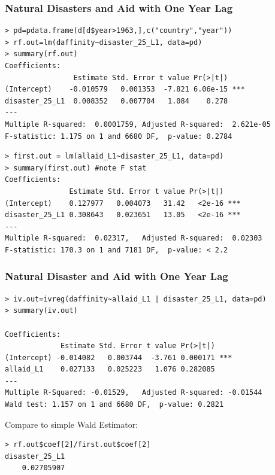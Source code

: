 \documentclass[xcolor=dvipsnames]{beamer}
\begin{document}
\begin{frame}[fragile]
\frametitle{Natural Disasters and Aid with One Year Lag}
\scriptsize
\begin{verbatim}
> pd=pdata.frame(d[d$year>1963,],c("country","year"))
> rf.out=lm(daffinity~disaster_25_L1, data=pd)
> summary(rf.out)
Coefficients:
                Estimate Std. Error t value Pr(>|t|)    
(Intercept)    -0.010579   0.001353  -7.821 6.06e-15 ***
disaster_25_L1  0.008352   0.007704   1.084    0.278    
---
Multiple R-squared:  0.0001759,	Adjusted R-squared:  2.621e-05 
F-statistic: 1.175 on 1 and 6680 DF,  p-value: 0.2784
\end{verbatim}
\begin{verbatim}
> first.out = lm(allaid_L1~disaster_25_L1, data=pd)
> summary(first.out) #note F stat
Coefficients:
               Estimate Std. Error t value Pr(>|t|)    
(Intercept)    0.127977   0.004073   31.42   <2e-16 ***
disaster_25_L1 0.308643   0.023651   13.05   <2e-16 ***
---
Multiple R-squared:  0.02317,	Adjusted R-squared:  0.02303 
F-statistic: 170.3 on 1 and 7181 DF,  p-value: < 2.2
\end{verbatim}
\end{frame}

\begin{frame}[fragile]
\frametitle{Natural Disaster and Aid with One Year Lag}
\scriptsize
\begin{verbatim}
> iv.out=ivreg(daffinity~allaid_L1 | disaster_25_L1, data=pd)
> summary(iv.out)

Coefficients:
             Estimate Std. Error t value Pr(>|t|)    
(Intercept) -0.014082   0.003744  -3.761 0.000171 ***
allaid_L1    0.027133   0.025223   1.076 0.282085    
---
Multiple R-Squared: -0.01529,	Adjusted R-squared: -0.01544 
Wald test: 1.157 on 1 and 6680 DF,  p-value: 0.2821 
\end{verbatim}
\small
{} Compare to simple Wald Estimator:\\
\scriptsize
\begin{verbatim}
> rf.out$coef[2]/first.out$coef[2]
disaster_25_L1 
    0.02705907 
\end{verbatim}
\end{frame}
\end{document}
